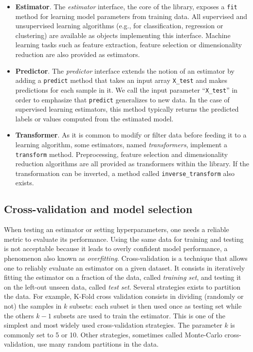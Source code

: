 \documentclass{frontiersSCNS} %
\begin{document}
\begin{itemize}
\item {\bf Estimator}. The \textit{estimator} interface, the core of the
    library, exposes a \texttt{fit} method for learning model parameters from training data.
    All supervised
    and unsupervised learning algorithms (e.g., for classification, regression or
    clustering) are available as objects implementing this interface. Machine
    learning tasks such as feature extraction, feature selection or dimensionality
    reduction are also provided as estimators.

\item {\bf Predictor}. The \textit{predictor} interface extends the notion of an estimator
    by adding a \texttt{predict}
    method that takes an input array \texttt{X\_test} and makes
    predictions for each sample in it.
    We call the input parameter ``\texttt{X\_test}'' in order
    to emphasize that \texttt{predict} generalizes to new data. In the case of
    supervised learning estimators, this method typically returns the predicted
    labels or values computed from the estimated model.

\item {\bf Transformer}. As it is common to modify or filter data before feeding it to a learning
    algorithm, some estimators, named \textit{transformers}, implement a
    \texttt{transform} method. Preprocessing, feature selection and
    dimensionality reduction
    algorithms are all provided as transformers within the library. If the transformation
    can be inverted, a method called \texttt{inverse\_transform} also exists.

\end{itemize}

\subsection{Cross-validation and model selection}

When testing an estimator or setting hyperparameters, one needs a reliable
metric to evaluate its performance. Using the same
data for training and testing is not acceptable because it leads to
overly confident model performance, a phenomenon also known as \emph{overfitting}.
Cross-validation is a technique that allows one to reliably evaluate an
estimator on a given dataset. It consists in iteratively fitting the
estimator on a fraction of the data, called \emph{training set}, and testing it
on the left-out unseen data, called \emph{test set}.
Several strategies exists to partition the data.
For example, K-Fold cross validation consists in dividing (randomly or not) the samples in $k$
subsets: each subset is then used once as testing set while the others $k - 1$
subsets are used to train the estimator. This is one of the simplest and most
widely used cross-validation strategies. The parameter $k$ is commonly set
to 5 or 10. Other strategies, sometimes called Monte-Carlo cross-validation,
use many random partitions in the data.
\end{document}
